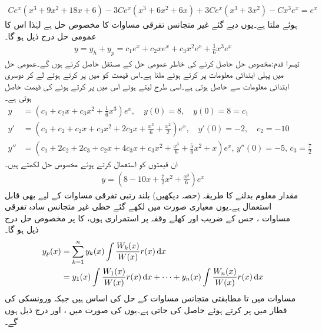 \begin{align*}
Ce^x(x^3+9x^2+18x+6)-3Ce^x(x^3+6x^2+6x)+3Ce^x(x^3+3x^2)-Cx^3e^x=e^{x}
\end{align*}
ہوئے  ملتا ہے۔یوں دیے گئے غیر متجانس تفرقی مساوات کا مخصوص حل  ہے لہٰذا اس کا عمومی حل درج ذیل ہو گا۔
\begin{align*}
y=y_h+y_p=c_1e^x+c_2xe^x+c_3x^2e^x+\frac{1}{6}x^3e^x
\end{align*}
تیسرا قدم:\quad مخصوص حل حاصل کرنے کی خاطر عمومی حل کے مستقل حاصل کرنے ہوں گے۔عمومی حل میں پہلی ابتدائی معلومات  پر کرتے ہوئے  ملتا ہے۔اس قیمت کو  میں پر کرتے ہوئے  لے کر دوسری ابتدائی معلومات  سے  حاصل ہوتی ہے۔اسی طرح  لیتے ہوئے اس میں  پر کرتے ہوئے  کی قیمت حاصل ہوتی ہے۔
\begin{align*}
y&=(c_1+c_2x+c_3x^2+\frac{1}{6}x^3)e^x, \quad y(0)=8, \quad y(0)=8=c_1\\
y'&=(c_1+c_2+c_2x+c_3x^2+2c_3x+\frac{x^3}{6}+\frac{x^2}{2})e^x, \quad y'(0)=-2, \quad c_2=-10\\
y''&=(c_1+2c_2+2c_3+c_2x+4c_3x+c_3x^2+\frac{x^3}{6}+\frac{5}{6}x^2+x)e^x,\,y''(0)=-5, \, c_3=\frac{7}{2}
\end{align*} 
ان قیمتوں کو استعمال کرتے ہوئے مخصوص حل لکھتے ہیں۔
\begin{align*}
y=\left(8-10x+\frac{7}{2}x^2+\frac{x^3}{6}\right)e^x
\end{align*}
مقدار معلوم بدلنے کا طریقہ (حصہ  دیکھیں) بلند رتبی تفرقی مساوات  کے لیے بھی قابل استعمال ہے۔یوں معیاری صورت میں لکھے گئے خطی غیر متجانس سادہ تفرقی مساوات  ، جس کے  ضریب  اور  کھلے وقفہ  پر استمراری ہوں، کا   پر مخصوص حل  درج ذیل ہو گا۔
\begin{gather}
\begin{aligned}\label{مساوات_سادہ_بلند_متعین_متغیرات_بدلنے_الف}
y_p(x)&=\sum_{k=1}^{n} y_k(x)\int \frac{W_k(x)}{W(x)} r(x)\dif x\\
&=y_1(x)\int \frac{W_1(x)}{W(x)}r(x)\dif x+\cdots+y_n(x)\int \frac{W_n(x)}{W(x)}r(x)\dif x
\end{aligned}
\end{gather}
مساوات  میں  تا  مطابقتی متجانس مساوات  کے حل کی اساس ہیں جبکہ ورونسکی  کی  قطار میں  پر کرتے ہوئے  حاصل کی جاتی ہے۔یوں  کی صورت میں ،  اور  درج ذیل ہوں گے۔
